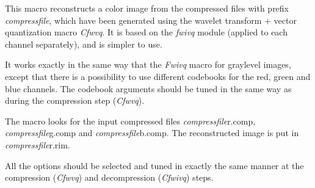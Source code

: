 This macro reconstructs a color image from the compressed files 
with prefix {\em compressfile}, 
which have been generated using the wavelet transform + vector quantization 
macro {\em Cfwvq}. It is based on the {\em fwivq} module (applied to 
each channel separately), and is simpler to use. 

It works exactly in the same way that the {\em Fwivq} macro for graylevel 
images, except that there is a possibility to use different codebooks 
for the red, green and blue channels. The codebook arguments should 
be tuned in the same way as during the compression step ({\em Cfwvq}). 

The macro looks for the input compressed files {\em compressfile}r.comp, 
{\em compressfile}g.comp and {\em compressfile}b.comp. 
The reconstructed image is put in {\em compressfile}r.rim. 

All the options should be selected and tuned in exactly the same 
manner at the compression ({\em Cfwvq}) and decompression ({\em Cfwivq}) 
steps. 
